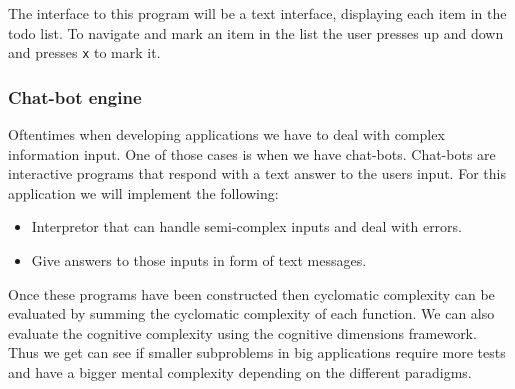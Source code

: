 The interface to this program will be a text interface, displaying each item in
the todo list. To navigate and mark an item in the list the user presses up and
down and presses \texttt{x} to mark it.

\subsubsection*{Chat-bot engine}

Oftentimes when developing applications we have to deal with complex information
input. One of those cases is when we have chat-bots. Chat-bots are interactive
programs that respond with a text answer to the users input. For this
application we will implement the following:

\begin{itemize}
    \item Interpretor that can handle semi-complex inputs and deal with errors.
    \item Give answers to those inputs in form of text messages.
\end{itemize}

\noindent Once these programs have been constructed then cyclomatic complexity
can be evaluated by summing the cyclomatic complexity of each function. We can
also evaluate the cognitive complexity using the cognitive dimensions framework.
Thus we get can see if smaller subproblems in big applications require more
tests and have a bigger mental complexity depending on the different paradigms.


